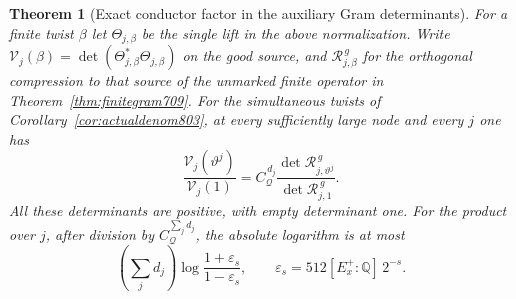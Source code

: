 \documentclass[a4paper,11pt]{article}
\newtheorem{theorem}[proposition]{Theorem}
\theoremstyle{definition}
\theoremstyle{remark}
\numberwithin{equation}{section}
\begin{document}
\begin{theorem}[Exact conductor factor in the auxiliary Gram determinants]
\leavevmode\label{thm:auxdet805}
For a finite twist \(\beta\) let \(\Theta_{j,\beta}\) be the
single lift in the above normalization. Write
\(\mathcal V_j(\beta)=\det(\Theta_{j,\beta}^{*}\Theta_{j,\beta})\)
on the good source, and \(\mathcal R_{j,\beta}^{\,g}\) for the
orthogonal compression to that source of the unmarked finite
operator in Theorem~\ref{thm:finitegram709}. For the simultaneous
twists of Corollary~\ref{cor:actualdenom803}, at every sufficiently
large node and every \(j\) one has
\[
  \frac{\mathcal V_j(\vartheta^j)}{\mathcal V_j(1)}
       = C_{\mathcal Q}^{\,d_j}
            \frac{\det\mathcal R_{j,\vartheta^j}^{\,g}}
                 {\det\mathcal R_{j,1}^{\,g}}.
\]
All these determinants are positive, with empty determinant one.
For the product over \(j\), after division by
\(C_{\mathcal Q}^{\sum_j d_j}\), the absolute logarithm is at
most
\[
          \left(\sum_j d_j\right)
          \log\frac{1+\varepsilon_s}{1-\varepsilon_s},
              \qquad \varepsilon_s=512 [E_x^+:\mathbb Q]\,2^{-s}.
\]
\end{theorem}
\end{document}
